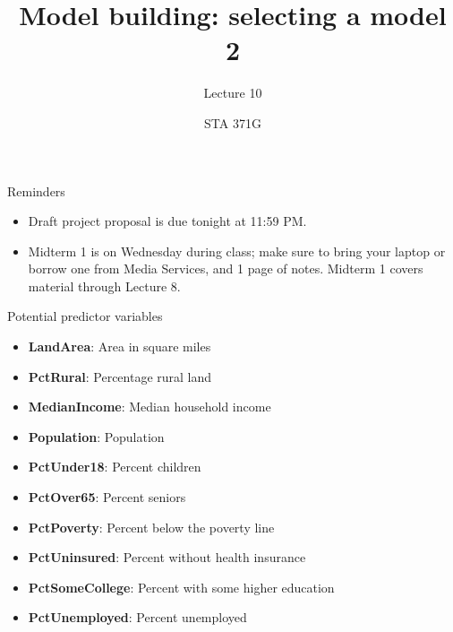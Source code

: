 \documentclass{beamer}\usepackage[]{graphicx}\usepackage[]{color}
\title{Model building: selecting a model 2}
\subtitle{Lecture 10}
\author{STA 371G}
\begin{document}
  
  

  \frame{\maketitle}



  \begin{darkframes}
    \begin{frame}{Reminders}
      \begin{itemize}
        \item Draft project proposal is due tonight at 11:59 PM.
        \item Midterm 1 is on Wednesday during class; make sure to bring your laptop or borrow one from Media Services, and 1 page of notes. Midterm 1 covers material through Lecture 8.
      \end{itemize}
    \end{frame}

    \begin{frame}
    \end{frame}

    \begin{frame}[fragile]{Potential predictor variables}
      \begin{itemize}
        \item \textbf{LandArea}:       Area in square miles
        \item \textbf{PctRural}:       Percentage rural land
        \item \textbf{MedianIncome}:   Median household income
        \item \textbf{Population}:     Population
        \item \textbf{PctUnder18}:     Percent children
        \item \textbf{PctOver65}:      Percent seniors
        \item \textbf{PctPoverty}:     Percent below the poverty line
        \item \textbf{PctUninsured}:   Percent without health insurance
        \item \textbf{PctSomeCollege}: Percent with some higher education
        \item \textbf{PctUnemployed}:  Percent unemployed
      \end{itemize}
    \end{frame}


\end{darkframes}
\end{document}
